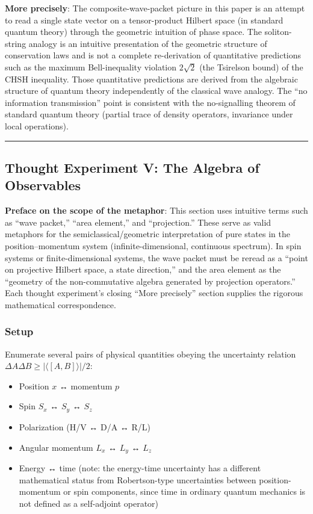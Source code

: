 \documentclass[
]{article}
\providecommand{\tightlist}{%
  \setlength{\itemsep}{0pt}\setlength{\parskip}{0pt}}
\begin{document}
\textbf{More precisely}: The composite-wave-packet picture in this paper
is an attempt to read a single state vector on a tensor-product Hilbert
space (in standard quantum theory) through the geometric intuition of
phase space. The soliton-string analogy is an intuitive presentation of
the geometric structure of conservation laws and is not a complete
re-derivation of quantitative predictions such as the maximum
Bell-inequality violation \(2\sqrt{2}\) (the Tsirelson bound) of the
CHSH inequality. Those quantitative predictions are derived from the
algebraic structure of quantum theory independently of the classical
wave analogy. The ``no information transmission'' point is consistent
with the no-signalling theorem of standard quantum theory (partial trace
of density operators, invariance under local operations).

\begin{center}\rule{0.5\linewidth}{0.5pt}\end{center}

\subsection{Thought Experiment V: The Algebra of
Observables}\label{thought-experiment-v-the-algebra-of-observables}

\textbf{Preface on the scope of the metaphor}: This section uses
intuitive terms such as ``wave packet,'' ``area element,'' and
``projection.'' These serve as valid metaphors for the
semiclassical/geometric interpretation of pure states in the
position--momentum system (infinite-dimensional, continuous spectrum).
In spin systems or finite-dimensional systems, the wave packet must be
reread as a ``point on projective Hilbert space, a state direction,''
and the area element as the ``geometry of the non-commutative algebra
generated by projection operators.'' Each thought experiment's closing
``More precisely'' section supplies the rigorous mathematical
correspondence.

\subsubsection{Setup}\label{setup-4}

Enumerate several pairs of physical quantities obeying the uncertainty
relation \(\Delta A \Delta B \geq |\langle [A,B] \rangle|/2\):

\begin{itemize}
\tightlist
\item
  Position \(x\) ↔ momentum \(p\)
\item
  Spin \(S_x\) ↔ \(S_y\) ↔ \(S_z\)
\item
  Polarization (H/V ↔ D/A ↔ R/L)
\item
  Angular momentum \(L_x\) ↔ \(L_y\) ↔ \(L_z\)
\item
  Energy ↔ time (note: the energy-time uncertainty has a different
  mathematical status from Robertson-type uncertainties between
  position-momentum or spin components, since time in ordinary quantum
  mechanics is not defined as a self-adjoint operator)
\end{itemize}
\end{document}
